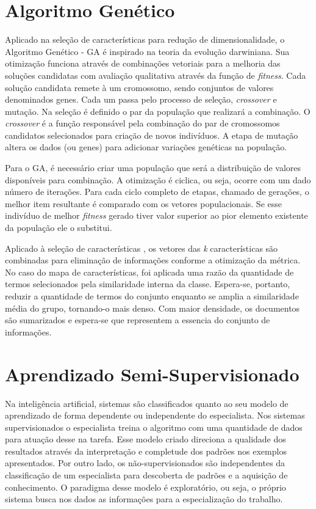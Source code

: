 \section{Algoritmo Genético}
Aplicado na seleção de características para redução de dimensionalidade, o Algoritmo Genético - GA \cite{haupt2004} é inspirado na teoria da evolução darwiniana. Sua otimização funciona através de combinações vetoriais para a melhoria das soluções candidatas com avaliação qualitativa através da função de \textit{fitness}. Cada solução candidata remete à um cromossomo, sendo conjuntos de valores denominados genes. Cada um passa pelo processo de seleção, \textit{crossover} e mutação. Na seleção é definido o par da população que realizará a combinação. O \textit{crossover} é a função responsável pela combinação do par de cromossomos candidatos selecionados para criação de novos indivíduos. A etapa de mutação altera os dados (ou genes) para adicionar variações genéticas na população.

Para o GA, é necessário criar uma população que será a distribuição de valores disponíveis para combinação. A otimização é ciclica, ou seja, ocorre com um dado número de iterações. Para cada ciclo completo de etapas, chamado de gerações, o melhor item resultante é comparado com os vetores populacionais.  Se esse indivíduo de melhor \textit{fitness} gerado tiver valor superior ao pior elemento existente da população ele o substitui.

Aplicado à seleção de características \cite{raymer2000}, os vetores das \textit{k} características são combinadas para eliminação de informações conforme a otimização da métrica. No caso do mapa de características, foi aplicada uma razão da quantidade de termos selecionados pela similaridade interna da classe. Espera-se, portanto, reduzir a quantidade de termos do conjunto enquanto se amplia a similaridade média do grupo, tornando-o mais denso. Com maior densidade, os documentos são sumarizados e espera-se que representem a essencia do conjunto de informações.

\section{Aprendizado Semi-Supervisionado}
Na inteligência artificial, sistemas são classificados quanto ao seu modelo de aprendizado de forma dependente ou independente do especialista. Nos sistemas supervisionados o especialista treina o algoritmo com uma quantidade de dados para atuação desse na tarefa. Esse modelo criado direciona a qualidade dos resultados através da interpretação e completude dos padrões nos exemplos apresentados. Por outro lado, os não-supervisionados são independentes da classificação de um especialista para descoberta de padrões e a aquisição de conhecimento. O paradigma desse modelo é exploratório, ou seja, o próprio sistema busca nos dados as informações para a especialização do trabalho.

